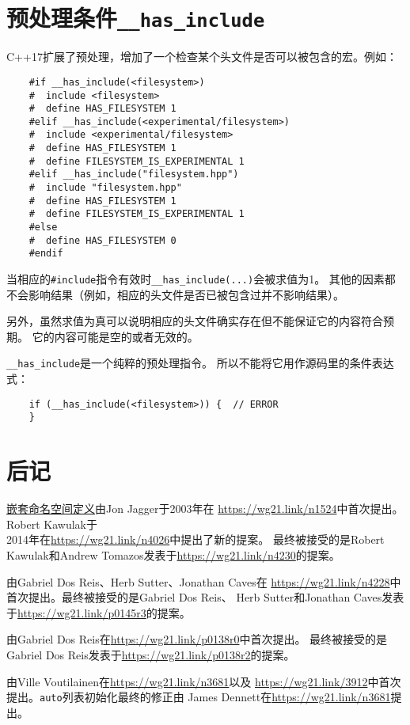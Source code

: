 \section{预处理条件\texttt{\_\_has\_include}}\label{ch8.9}
C++17扩展了预处理，增加了一个检查某个头文件是否可以被包含的宏。例如：
\begin{lstlisting}
    #if __has_include(<filesystem>)
    #  include <filesystem>
    #  define HAS_FILESYSTEM 1
    #elif __has_include(<experimental/filesystem>)
    #  include <experimental/filesystem>
    #  define HAS_FILESYSTEM 1
    #  define FILESYSTEM_IS_EXPERIMENTAL 1
    #elif __has_include("filesystem.hpp")
    #  include "filesystem.hpp"
    #  define HAS_FILESYSTEM 1
    #  define FILESYSTEM_IS_EXPERIMENTAL 1
    #else
    #  define HAS_FILESYSTEM 0
    #endif
\end{lstlisting}
当相应的\texttt{\#include}指令有效时\texttt{\_\_has\_include(...)}会被求值为1。
其他的因素都不会影响结果（例如，相应的头文件是否已被包含过并不影响结果）。

另外，虽然求值为真可以说明相应的头文件确实存在但不能保证它的内容符合预期。
它的内容可能是空的或者无效的。

\texttt{\_\_has\_include}是一个纯粹的预处理指令。
所以不能将它用作源码里的条件表达式：
\begin{lstlisting}
    if (__has_include(<filesystem>)) {  // ERROR
    }
\end{lstlisting}

\section{后记}
\hyperref[ch8.1]{嵌套命名空间定义}由Jon Jagger于2003年在
\url{https://wg21.link/n1524}中首次提出。
Robert Kawulak于\\
2014年在\url{https://wg21.link/n4026}中提出了新的提案。
最终被接受的是Robert Kawulak和Andrew Tomazos发表于\url{https://wg21.link/n4230}的提案。

由Gabriel Dos Reis、Herb Sutter、Jonathan Caves在
\url{https://wg21.link/n4228}中首次提出。最终被接受的是Gabriel Dos Reis、
Herb Sutter和Jonathan Caves发表于\url{https://wg21.link/p0145r3}的提案。

由Gabriel Dos Reis在\url{https://wg21.link/p0138r0}中首次提出。
最终被接受的是Gabriel Dos Reis发表于\url{https://wg21.link/p0138r2}的提案。

由Ville Voutilainen在\url{https://wg21.link/n3681}以及
\url{https://wg21.link/3912}中首次提出。\texttt{auto}列表初始化最终的修正由
James Dennett在\url{https://wg21.link/n3681}提出。

